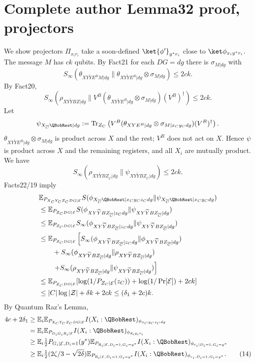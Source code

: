 \section*{Complete author Lemma32 proof, projectors}
We show projectors $\Pi_{x_ir_i}$ take a soon-defined $\ket{\phi'}_{y^*r_i}$ close to $\ket\phi_{x_iy^*r_i}$. The message $M$ has $ck$ qubits. By Fact21 for each $DG=dg$ there is $\sigma_{M|dg}$ with
\[S_\infty(\theta_{XY\widetilde YE^BM|dg}\|\theta_{XY\widetilde YE^B|dg}\otimes\sigma_{M|dg})\le2ck.\]
By Fact20,
\[S_\infty(\rho_{XY\widetilde YBZ|dg}\|V^B(\theta_{XY\widetilde YE^B|dg}\otimes\sigma_{M|dg})(V^B)^\dagger)\le2ck.\]
Let
\[\psi_{X_{\overline C}\QBobRest|dg}:=\operatorname{Tr}_{Z_C}\left(V^B(\theta_{XYE^B|dg}\otimes\sigma_{M|x_Cy_Cdg})(V^B)^\dagger\right).\]
$\theta_{XY\widetilde YE^B|dg}\otimes\sigma_{M|dg}$ is product across $X$ and the rest; $V^B$ does not act on $X$. Hence $\psi$ is product across $X$ and the remaining registers, and all $X_i$ are mutually product. We have
\[S_\infty(\rho_{XY\widetilde YBZ_{\overline C}|dg}\|\psi_{XY\widetilde YBZ_{\overline C}|dg})\le2ck.\]
Facts22/19 imply
\begin{align*}&\mathbb E_{P_{X_CY_CZ_CDG|\mathcal E}}S(\phi_{X_{\overline C}\QBobRest|x_Cy_Cz_Cdg}\|\psi_{X_{\overline C}\QBobRest|x_Cy_Cdg})\\&\le\mathbb E_{P_{Z_CDG|\mathcal E}}S(\phi_{XY\widetilde YBZ_{\overline C}|z_Cdg}\|\psi_{XY\widetilde YBZ_{\overline C}|dg})\\&\le\mathbb E_{P_{Z_CDG|\mathcal E}}S_\infty(\phi_{XY\widetilde YBZ_{\overline C}|z_Cdg}\|\psi_{XY\widetilde YBZ_{\overline C}|dg})\\&\le\mathbb E_{P_{Z_CDG|\mathcal E}}\left[S_\infty(\phi_{XY\widetilde YBZ_{\overline C}|z_Cdg}\|\phi_{XY\widetilde YBZ_{\overline C}|dg})\right.\\&\qquad+S_\infty(\phi_{XY\widetilde YBZ_{\overline C}|dg}\|\rho_{XY\widetilde YBZ_{\overline C}|dg})\\&\qquad\left.+S_\infty(\rho_{XY\widetilde YBZ_{\overline C}|dg}\|\psi_{XY\widetilde YBZ_{\overline C}|dg})\right]\\&\le\mathbb E_{P_{Z_CDG|\mathcal E}}[\log(1/P_{Z_C|\mathcal E}(z_C))+\log(1/\Pr[\mathcal E])+2ck]\\&\le|C|\log|\mathcal Z|+\delta k+2ck\le(\delta_1+2c)k.
\end{align*}
By Quantum Raz's Lemma,
\begin{align*}4c+2\delta_1&\ge\mathbb E_i\mathbb E_{P_{X_CY_CZ_CDG|\mathcal E}}I(X_i:\QBobRest)_{\phi_{x_Cy_Cz_Cdg}}\\&=\mathbb E_i\mathbb E_{P_{D_iG_iR_i|\mathcal E}}I(X_i:\QBobRest)_{\phi_{d_ig_ir_i}}\\&\ge\mathbb E_i\tfrac12P_{G_i|\mathcal E,D_i=1}(y^*)\mathbb E_{P_{R_i|\mathcal E,D_i=1,G_i=y^*}}I(X_i:\QBobRest)_{\phi_{r_i|D_i=1,G_i=y^*}}\\&\ge\mathbb E_i\tfrac12(2\zeta/3-\sqrt{2\delta})\mathbb E_{P_{R_i|\mathcal E,D_i=1,G_i=y^*}}I(X_i:\QBobRest)_{\phi_{r_i,D_i=1,G_i=y^*}}.\tag{14}\end{align*}
